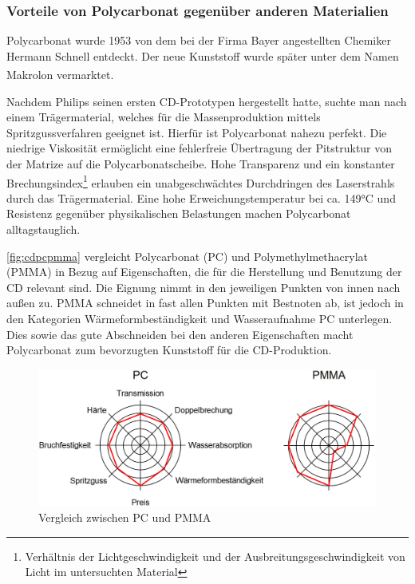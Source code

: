 \subsubsection{Vorteile von Polycarbonat gegenüber anderen Materialien}

Polycarbonat wurde 1953 von dem bei der Firma Bayer angestellten Chemiker
Hermann Schnell entdeckt. Der neue Kunststoff wurde später unter dem Namen
Makrolon\textsuperscript{\textregistered} vermarktet. \cite{cuzpc}

Nachdem Philips seinen ersten CD-Prototypen hergestellt hatte, suchte man nach
einem Trägermaterial, welches für die Massenproduktion mittels
Spritzgussverfahren geeignet ist. Hierfür ist Polycarbonat nahezu perfekt. Die
niedrige Viskosität ermöglicht eine fehlerfreie Übertragung der Pitstruktur von
der Matrize auf die Polycarbonatscheibe. Hohe Transparenz und ein konstanter
Brechungsindex\footnote{Verhältnis der Lichtgeschwindigkeit und der
Ausbreitungsgeschwindigkeit von Licht im untersuchten Material} erlauben ein
unabgeschwächtes Durchdringen des Laserstrahls durch das Trägermaterial. Eine
hohe Erweichungstemperatur bei ca. 149°C \cite{cuzpc2} und Resistenz gegenüber
physikalischen Belastungen machen Polycarbonat alltagstauglich. \cite{cfcd}

\autoref{fig:cdpcpmma} vergleicht Polycarbonat (PC) und Polymethylmethacrylat
(PMMA) in Bezug auf Eigenschaften, die für die Herstellung und Benutzung der CD
relevant sind. Die Eignung nimmt in den jeweiligen Punkten von innen nach außen
zu. PMMA schneidet in fast allen Punkten mit Bestnoten ab, ist jedoch in den
Kategorien Wärmeformbeständigkeit und Wasseraufnahme PC unterlegen. Dies sowie
das gute Abschneiden bei den anderen Eigenschaften macht Polycarbonat zum
bevorzugten Kunststoff für die CD-Produktion.

\begin{figure}[h]
    \begin{center}
        \begin{minipage}[t]{\textwidth}
            \begin{center}
                \includegraphics[height=0.1\textheight]{Bilder/Optische_Datentraeger_Die_Compact_Disc/Traegermaterial_Polycarbonat/cdpcpmma.png}
                \caption[Vergleich zwischen PC und PMMA \newline Roth, Klaus: CD, DVD \& Co.: Die Chemie der schillernden Scheiben, in: Chemie in unserer Zeit (41/2007), S. 337]{Vergleich zwischen PC und PMMA}
                \label{fig:cdpcpmma}
            \end{center}
        \end{minipage}
    \end{center}
\end{figure}
